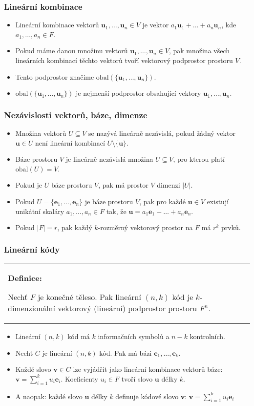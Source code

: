 \documentclass{beamer}
\newenvironment{definice}
{
    \begin{center}
    \begin{tabular}{p{9cm}}
    \textbf{Definice:}
}
{
    \end{tabular}
    \end{center}
}
\newcommand{\vu}{\textbf{u}}
\newcommand{\vv}{\textbf{v}}
\newcommand{\e}{\textbf{e}}
\renewcommand{\span}{\mbox{obal}}
\newenvironment{itemizex}%
  {\large \begin{itemize}%
    \setlength{\itemsep}{8pt}%
    \setlength{\parskip}{8pt}}%
  {\end{itemize}}
\newenvironment{itemizey}%
  {\large \begin{itemize}%
    \setlength{\itemsep}{6pt}%
    \setlength{\parskip}{6pt}}%
  {\end{itemize}}
\begin{document}
\begin{frame}[t,fragile]\frametitle{Lineární kombinace} 
    \begin{itemizex}
        \item Lineární kombinace vektorů $\vu_1, \dots, \vu_n\in V$ je vektor $a_1\vu_1+\dots+a_n\vu_n$, kde $a_1,\dots,a_n\in F$.
        \item Pokud máme danou množinu vektorů $\vu_1, \dots, \vu_n\in V$, pak množina všech lineárních kombinací těchto vektorů tvoří vektorový podprostor prostoru $V$.
        \item Tento podprostor značíme $\span(\{\vu_1, \dots, \vu_n\})$.
        \item $\span(\{\vu_1, \dots, \vu_n\})$ je nejmenší podprostor obsahující vektory $\vu_1, \dots, \vu_n$.
    \end{itemizex}
\end{frame}



\begin{frame}[t,fragile]\frametitle{Nezávislosti vektorů, báze, dimenze} 
    \begin{itemizey}
        \item Množina vektorů $U\subseteq V$ se nazývá lineárně nezávislá, pokud žádný vektor $\vu\in U$ není lineární kombinací $U\setminus\{\vu\}$.
        \item Báze prostoru $V$ je lineárně nezávislá množina $U\subseteq V$, pro kterou platí $\span(U)=V$.
        \item Pokud je $U$ báze prostoru $V$, pak má prostor $V$ dimenzi $|U|$.
        \item Pokud $U=\{\e_1,\dots,\e_n\}$ je báze prostoru $V$, pak pro každé $\vu\in V$ existují unikátní skaláry $a_1,\dots,a_n\in F$ tak, že $\vu=a_1\e_1+\dots+a_n\e_n$.
        \item Pokud $|F|=r$, pak každý $k$-rozměrný vektorový prostor na $F$ má $r^k$ prvků.
    \end{itemizey}
\end{frame}


\begin{frame}[t,fragile]\frametitle{Lineární kódy} 
    \begin{definice}
        Nechť $F$ je konečné těleso. Pak lineární $(n,k)$ kód je $k$-dimenzionální vektorový (lineární) podprostor prostoru $F^n$. 
    \end{definice}

    \begin{itemizex}
        \item Lineární $(n,k)$ kód má $k$ informačních symbolů a $n-k$ kontrolních.
        \item Nechť $C$ je lineární $(n,k)$ kód. Pak má bázi $\e_1,\dots,\e_k$.
        \item Každé slovo $\vv\in C$ lze vyjádřit jako lineární kombinace vektorů báze: $\vv=\sum_{i=1}^k u_i\e_i$. Koeficienty $u_i\in F$ tvoří slovo $\vu$ délky $k$.
        \item A naopak: každé slovo $\vu$ délky $k$ definuje kódové slovo $\vv$: $\vv=\sum_{i=1}^ku_i\e_i$
    \end{itemizex}
\end{frame}
\end{document}
